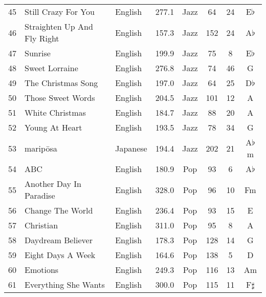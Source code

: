 \begin{table}
{\begin{tabular}{rllrcccc}
		45 & Still Crazy For You  & English & 277.1  & Jazz & 64 & 24 & E$\flat$\\ 
		46 & Straighten Up And Fly Right  & English & 157.3  & Jazz & 152 & 24 & A$\flat$\\ 
		47 & Sunrise  & English & 199.9  & Jazz & 75 & 8 & E$\flat$\\ 
		48 & Sweet Lorraine  & English & 276.8  & Jazz & 74 & 46 & G\\ 
		49 & The Christmas Song  & English & 197.0  & Jazz & 64 & 25 & D$\flat$\\ 
		50 & Those Sweet Words  & English & 204.5  & Jazz & 101 & 12 & A\\ 
		51 & White Christmas  & English & 184.7  & Jazz & 88 & 20 & A\\ 
		52 & Young At Heart  & English & 193.5  & Jazz & 78 & 34 & G\\ 
		53 & maripōsa  & Japanese & 194.4  & Jazz & 202 & 21 & A$\flat$m\\ 
		54 & ABC  & English & 180.9  & Pop & 93 & 6 & A$\flat$\\ 
		55 & Another Day In Paradise  & English & 328.0  & Pop & 96 & 10 & Fm\\ 
		56 & Change The World  & English & 236.4  & Pop & 93 & 15 & E\\ 
		57 & Christian  & English & 311.0  & Pop & 95 & 8 & A\\ 
		58 & Daydream Believer  & English & 178.3  & Pop & 128 & 14 & G\\ 
		59 & Eight Days A Week  & English & 164.6  & Pop & 138 & 5 & D\\ 
		60 & Emotions  & English & 249.3  & Pop & 116 & 13 & Am\\ 
		61 & Everything She Wants  & English & 300.0  & Pop & 115 & 11 & F$\sharp$\\ 
		\hline
	\end{tabular}}
\end{table}  
